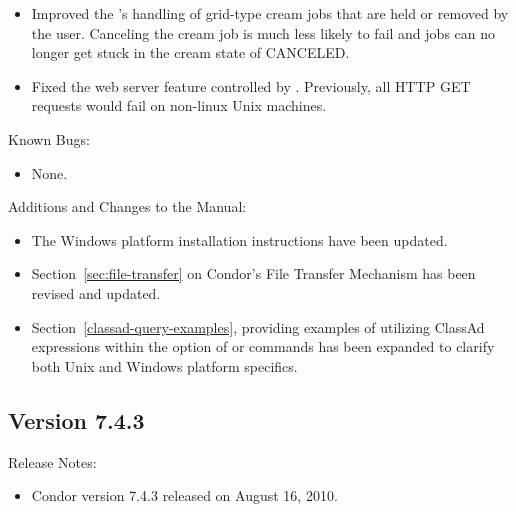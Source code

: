 \begin{itemize}
\item Improved the 's handling of grid-type cream jobs
that are held or removed by the user. Canceling the cream job is much less
likely to fail and jobs can no longer get stuck in the cream state of
CANCELED.

\item Fixed the web server feature controlled by .
Previously, all HTTP GET requests would fail on non-linux Unix machines.

\end{itemize}

\noindent Known Bugs:

\begin{itemize}

\item None.

\end{itemize}

\noindent Additions and Changes to the Manual:

\begin{itemize}

\item The Windows platform installation instructions have been updated.

\item Section~\ref{sec:file-transfer} on Condor's File Transfer Mechanism
has been revised and updated.

\item Section~\ref{classad-query-examples}, providing examples of utilizing
ClassAd expressions within the  option of 
or  commands has been expanded to clarify both
Unix and Windows platform specifics.

\end{itemize}


\subsection*{\label{sec:New-7-4-3}Version 7.4.3}

\noindent Release Notes:

\begin{itemize}

\item Condor version 7.4.3 released on August 16, 2010.

\end{itemize}


